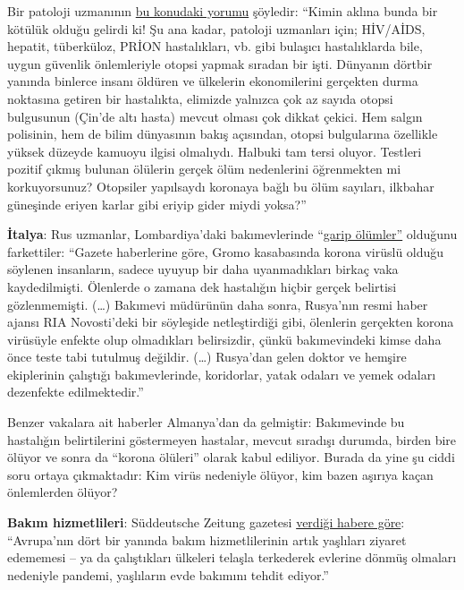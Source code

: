  Bir patoloji uzmanının
\href{https://www.youtube.com/watch?v=gSn_YaOYYcY}{bu konudaki yorumu}
şöyledir: ``Kimin aklına bunda bir kötülük olduğu gelirdi ki! Şu ana
kadar, patoloji uzmanları için; HİV/AİDS, hepatit, tüberküloz, PRİON
hastalıkları, vb. gibi bulaşıcı hastalıklarda bile, uygun güvenlik
önlemleriyle otopsi yapmak sıradan bir işti. Dünyanın dörtbir yanında
binlerce insanı öldüren ve ülkelerin ekonomilerini gerçekten durma
noktasına getiren bir hastalıkta, elimizde yalnızca çok az sayıda otopsi
bulgusunun (Çin'de altı hasta) mevcut olması çok dikkat çekici. Hem
salgın polisinin, hem de bilim dünyasının bakış açısından, otopsi
bulgularına özellikle yüksek düzeyde kamuoyu ilgisi olmalıydı. Halbuki
tam tersi oluyor. Testleri pozitif çıkmış bulunan ölülerin gerçek ölüm
nedenlerini öğrenmekten mi korkuyorsunuz? Otopsiler yapılsaydı koronaya
bağlı bu ölüm sayıları, ilkbahar güneşinde eriyen karlar gibi eriyip
gider miydi yoksa?''

\textbf{İtalya}: Rus uzmanlar, Lombardiya'daki bakımevlerinde
``\href{https://de.sputniknews.com/panorama/20200402326767475-fachpersonal-todesfaelle-lombardei-zeitung/}{garip
ölümler''} olduğunu farkettiler: ``Gazete haberlerine göre, Gromo
kasabasında korona virüslü olduğu söylenen insanların, sadece uyuyup bir
daha uyanmadıkları birkaç vaka kaydedilmişti. Ölenlerde o zamana dek
hastalığın hiçbir gerçek belirtisi gözlenmemişti. (\ldots{}) Bakımevi
müdürünün daha sonra, Rusya'nın resmi haber ajansı RIA Novosti'deki bir
söyleşide netleştirdiği gibi, ölenlerin gerçekten korona virüsüyle
enfekte olup olmadıkları belirsizdir, çünkü bakımevindeki kimse daha
önce teste tabi tutulmuş değildir. (\ldots{}) Rusya'dan gelen doktor ve
hemşire ekiplerinin çalıştığı bakımevlerinde, koridorlar, yatak odaları
ve yemek odaları dezenfekte edilmektedir.''

Benzer vakalara ait haberler Almanya'dan da gelmiştir: Bakımevinde bu
hastalığın belirtilerini göstermeyen hastalar, mevcut sıradışı durumda,
birden bire ölüyor ve sonra da ``korona ölüleri'' olarak kabul ediliyor.
Burada da yine şu ciddi soru ortaya çıkmaktadır: Kim virüs nedeniyle
ölüyor, kim bazen aşırıya kaçan önlemlerden ölüyor?

\textbf{Bakım hizmetlileri}: Süddeutsche Zeitung gazetesi
\href{https://www.sueddeutsche.de/politik/coronavirus-pflegekraefte-ausland-1.4866124}{verdiği
habere göre}: ``Avrupa'nın dört bir yanında bakım hizmetlilerinin artık
yaşlıları ziyaret edememesi -- ya da çalıştıkları ülkeleri telaşla
terkederek evlerine dönmüş olmaları nedeniyle pandemi, yaşlıların evde
bakımını tehdit ediyor.''

